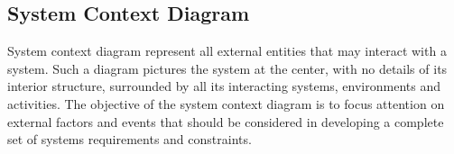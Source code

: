 
\subsection{System Context Diagram}

System context diagram represent all external entities that may interact with a system. Such a diagram pictures the system at the center, with no details of its interior structure, surrounded by all its interacting systems, environments and activities. The objective of the system context diagram is to focus attention on external factors and events that should be considered in developing a complete set of systems requirements and constraints.

